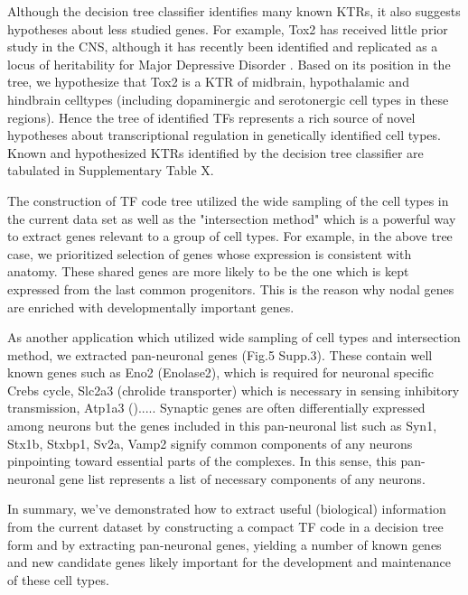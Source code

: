 Although the decision tree classifier identifies many known KTRs, it also suggests hypotheses about less studied genes. For example, Tox2 has received little prior study in the CNS, although it has recently been identified and replicated as a locus of heritability for Major Depressive Disorder \cite{Zeng_2016}. Based on its position in the tree, we hypothesize that Tox2 is a KTR of midbrain, hypothalamic and hindbrain celltypes (including dopaminergic and serotonergic cell types in these regions). Hence the tree of identified TFs represents a rich source of novel hypotheses about transcriptional regulation in genetically identified cell types. Known and hypothesized KTRs identified by the decision tree classifier are tabulated in Supplementary Table X.

The construction of TF code tree utilized the wide sampling of the cell types in the current data set as well as the "intersection method" which is a powerful way to extract genes relevant to a group of cell types. For example, in the above tree case, we prioritized selection of genes whose expression is consistent with anatomy. These shared genes are more likely to be the one which is kept expressed from the last common progenitors. This is the reason why nodal genes are enriched with developmentally important genes.

As another application which utilized wide sampling of cell types and intersection method, we  extracted pan-neuronal genes (Fig.5 Supp.3). These contain well known genes such as Eno2 (Enolase2), which is required for neuronal specific Crebs cycle, Slc2a3 (chrolide transporter) which is necessary in sensing inhibitory transmission, Atp1a3 ().....  Synaptic genes are often differentially expressed among neurons but the genes included in this pan-neuronal list such as Syn1, Stx1b, Stxbp1, Sv2a, Vamp2 signify common components of any neurons pinpointing toward essential parts of the complexes. In this sense, this pan-neuronal gene list represents a list of necessary components of any neurons.

In summary, we've demonstrated how to extract useful (biological) information from the current dataset by constructing a compact TF code in a decision tree form and by extracting pan-neuronal genes, yielding a number of known genes and new candidate genes likely important for the development and maintenance of these cell types.
